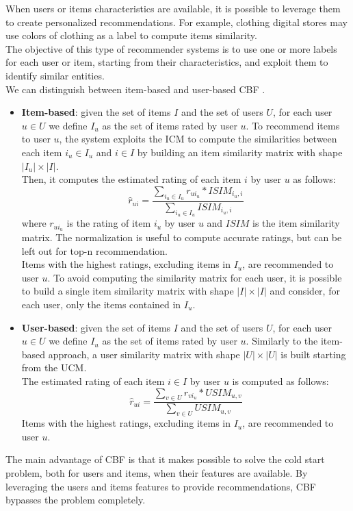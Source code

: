 When users or items characteristics are available, it is possible to leverage them to create personalized recommendations. For example, clothing digital stores may use colors of clothing as a label to compute items similarity.\\
The objective of this type of recommender systems is to use one or more labels for each user or item, starting from their characteristics, and exploit them to identify similar entities.\\
We can distinguish between item-based and user-based CBF \cite{10.1007/978-0-387-85820-3_1, 10.1007/978-3-540-72079-9_10}.
\begin{itemize}
\item \textbf{Item-based}: given the set of items $I$ and the set of users $U$, for each user $u \in U$ we define $I_u$ as the set of items rated by user $u$. To recommend items to user $u$, the system exploits the ICM to compute the similarities between each item $i_u \in I_u$ and $i \in I$ by building an item similarity matrix with shape $|I_u| \times |I|$.\\
Then, it computes the estimated rating of each item $i$ by user $u$ as follows:
\begin{equation*}
\hat{r}_{ui} = \frac{\sum_{i_u \in I_u} r_{ui_u} * ISIM_{i_u,i}}{\sum_{i_u \in I_u} ISIM_{i_u,i}}
\end{equation*}
where $r_{ui_u}$ is the rating of item $i_u$ by user $u$ and $ISIM$ is the item similarity matrix. The normalization is useful to compute accurate ratings, but can be left out for top-n recommendation.\\
Items with the highest ratings, excluding items in $I_u$, are recommended to user $u$.
To avoid computing the similarity matrix for each user, it is possible to build a single item similarity matrix with shape $|I| \times |I|$ and consider, for each user, only the items contained in $I_u$.
\item \textbf{User-based}: given the set of items $I$ and the set of users $U$, for each user $u \in U$ we define $I_u$ as the set of items rated by user $u$. Similarly to the item-based approach, a user similarity matrix with shape $|U| \times |U|$ is built starting from the UCM.\\
The estimated rating of each item $i \in I$ by user $u$ is computed as follows:
\begin{equation*}
\hat{r}_{ui} = \frac{\sum_{v \in U} r_{vi_u} * USIM_{u,v}}{\sum_{v \in U} USIM_{u,v}}
\end{equation*}
Items with the highest ratings, excluding items in $I_u$, are recommended to user $u$.
\end{itemize}\par
The main advantage of CBF is that it makes possible to solve the cold start problem, both for users and items, when their features are available. By leveraging the users and items features to provide recommendations, CBF bypasses the problem completely.


